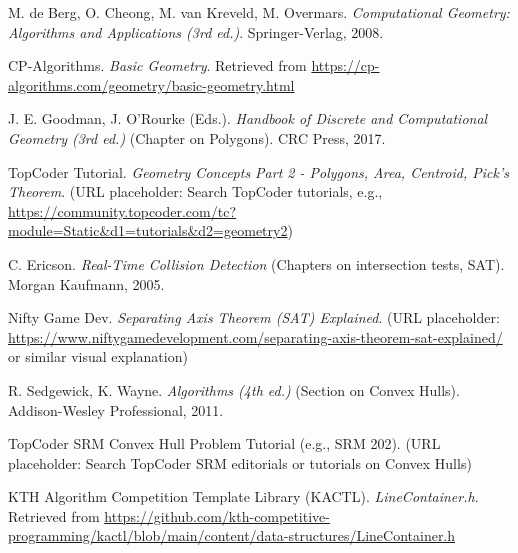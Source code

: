 \begin{thebibliography}{99} %

M. de Berg, O. Cheong, M. van Kreveld, M. Overmars.
\textit{Computational Geometry: Algorithms and Applications (3rd ed.)}.
Springer-Verlag, 2008.
\label{ref:deberg2008}

CP-Algorithms. \textit{Basic Geometry}.
Retrieved from \url{https://cp-algorithms.com/geometry/basic-geometry.html}
\label{ref:cpalgo_basic_geom}

J. E. Goodman, J. O'Rourke (Eds.).
\textit{Handbook of Discrete and Computational Geometry (3rd ed.)} (Chapter on Polygons).
CRC Press, 2017.
\label{ref:goodman_orourke_polygons}

TopCoder Tutorial. \textit{Geometry Concepts Part 2 - Polygons, Area, Centroid, Pick's Theorem}.
(URL placeholder: Search TopCoder tutorials, e.g., \url{https://community.topcoder.com/tc?module=Static&d1=tutorials&d2=geometry2})
\label{ref:topcoder_geom_p2}

C. Ericson.
\textit{Real-Time Collision Detection} (Chapters on intersection tests, SAT).
Morgan Kaufmann, 2005.
\label{ref:ericson_collision}

Nifty Game Dev. \textit{Separating Axis Theorem (SAT) Explained}.
(URL placeholder: \url{https://www.niftygamedevelopment.com/separating-axis-theorem-sat-explained/} or similar visual explanation)
\label{ref:nifty_sat}

R. Sedgewick, K. Wayne.
\textit{Algorithms (4th ed.)} (Section on Convex Hulls).
Addison-Wesley Professional, 2011.
\label{ref:sedgewick_wayne_hulls}

TopCoder SRM Convex Hull Problem Tutorial (e.g., SRM 202).
(URL placeholder: Search TopCoder SRM editorials or tutorials on Convex Hulls)
\label{ref:topcoder_srm_hull_tutorial}

KTH Algorithm Competition Template Library (KACTL). \textit{LineContainer.h}.
Retrieved from \url{https://github.com/kth-competitive-programming/kactl/blob/main/content/data-structures/LineContainer.h}
\label{ref:kactl_linecontainer}


\end{thebibliography}
